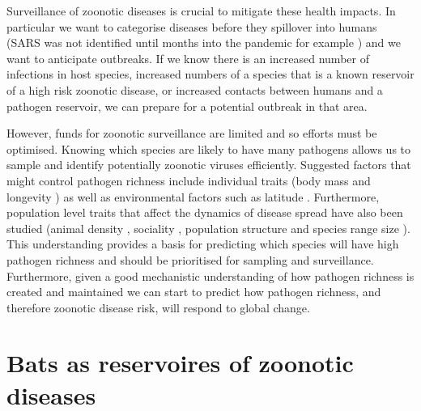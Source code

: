 
Surveillance of zoonotic diseases is crucial to mitigate these health impacts.
In particular we want to categorise diseases before they spillover into humans (SARS was not identified until months into the pandemic for example \cite{drosten2003identification}) and we want to anticipate outbreaks. 
If we know there is an increased number of infections in host species, increased numbers of a species that is a known reservoir of a high risk zoonotic disease, or increased contacts between humans and a pathogen reservoir, we can prepare for a potential outbreak in that area.

However, funds for zoonotic surveillance are limited and so efforts must be optimised.
Knowing which species are likely to have many pathogens allows us to sample and identify potentially zoonotic viruses efficiently.
Suggested factors that might control pathogen richness include individual traits (body mass \cite{kamiya2014determines, arneberg2002host, poulin1995phylogeny} and longevity \cite{nunn2003comparative, ezenwa2006host}) as well as environmental factors such as latitude \cite{poulin2010latitudinal, kamiya2014determines}.
Furthermore, population level traits that affect the dynamics of disease spread have also been studied (animal density \cite{kamiya2014determines, nunn2003comparative, arneberg2002host}, sociality \cite{bordes2007rodent, vitone2004body, altizer2003social, ezenwa2006host}, population structure \cite{nunes2006localized, maganga2014bat, gay2014parasite, turmelle2009correlates} and  species range size \cite{kamiya2014determines, nunn2003comparative}).
This understanding provides a basis for predicting which species will have high pathogen richness and should be prioritised for sampling and surveillance.
Furthermore, given a good mechanistic understanding of how pathogen richness is created and maintained we can start to predict how pathogen richness, and therefore zoonotic disease risk, will respond to global change.




\section{Bats as reservoires of zoonotic diseases}


